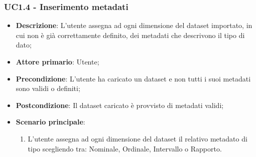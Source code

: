 \subsubsection{UC1.4 - Inserimento metadati}
\label{ssub:uc1.4}
\begin{itemize}
    \item \textbf{Descrizione}: L'utente assegna ad ogni dimensione del dataset importato,
                                in cui non è già correttamente definito,
                                dei metadati che descrivono il tipo di dato;


    \item \textbf{Attore primario}: Utente;
    
    \item \textbf{Precondizione}:   L'utente ha caricato un dataset e non tutti i suoi metadati sono validi o definiti;
    \item \textbf{Postcondizione}:  Il dataset caricato è provvisto di metadati validi;

	\item \textbf{Scenario principale}:
		\begin{enumerate}
            \item L'utente assegna ad ogni dimensione del dataset il relativo metadato di tipo scegliendo tra:
                    Nominale, Ordinale, Intervallo o Rapporto.
        \end{enumerate}

\end{itemize}


